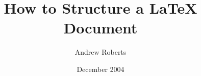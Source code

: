 \documentclass[11pt,a4paper]{report}
\begin{document}
\title{How to Structure a LaTeX Document}
\author{Andrew Roberts}
\date{December 2004}
\maketitle
\end{document}
